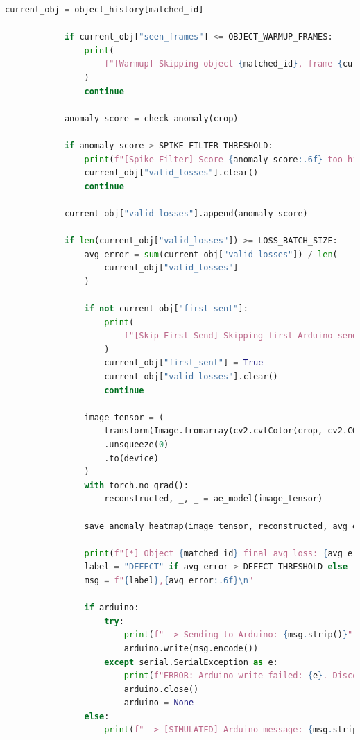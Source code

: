 \begin{lstlisting}[language=Python]
            current_obj = object_history[matched_id]

            if current_obj["seen_frames"] <= OBJECT_WARMUP_FRAMES:
                print(
                    f"[Warmup] Skipping object {matched_id}, frame {current_obj['seen_frames']}"
                )
                continue

            anomaly_score = check_anomaly(crop)

            if anomaly_score > SPIKE_FILTER_THRESHOLD:
                print(f"[Spike Filter] Score {anomaly_score:.6f} too high, ignored.")
                current_obj["valid_losses"].clear()
                continue

            current_obj["valid_losses"].append(anomaly_score)

            if len(current_obj["valid_losses"]) >= LOSS_BATCH_SIZE:
                avg_error = sum(current_obj["valid_losses"]) / len(
                    current_obj["valid_losses"]
                )

                if not current_obj["first_sent"]:
                    print(
                        f"[Skip First Send] Skipping first Arduino send for object {matched_id}"
                    )
                    current_obj["first_sent"] = True
                    current_obj["valid_losses"].clear()
                    continue

                image_tensor = (
                    transform(Image.fromarray(cv2.cvtColor(crop, cv2.COLOR_BGR2RGB)))
                    .unsqueeze(0)
                    .to(device)
                )
                with torch.no_grad():
                    reconstructed, _, _ = ae_model(image_tensor)

                save_anomaly_heatmap(image_tensor, reconstructed, avg_error, matched_id)

                print(f"[*] Object {matched_id} final avg loss: {avg_error:.6f}")
                label = "DEFECT" if avg_error > DEFECT_THRESHOLD else "OK"
                msg = f"{label},{avg_error:.6f}\n"

                if arduino:
                    try:
                        print(f"--> Sending to Arduino: {msg.strip()}")
                        arduino.write(msg.encode())
                    except serial.SerialException as e:
                        print(f"ERROR: Arduino write failed: {e}. Disconnecting.")
                        arduino.close()
                        arduino = None
                else:
                    print(f"--> [SIMULATED] Arduino message: {msg.strip()}")


\end{lstlisting}
